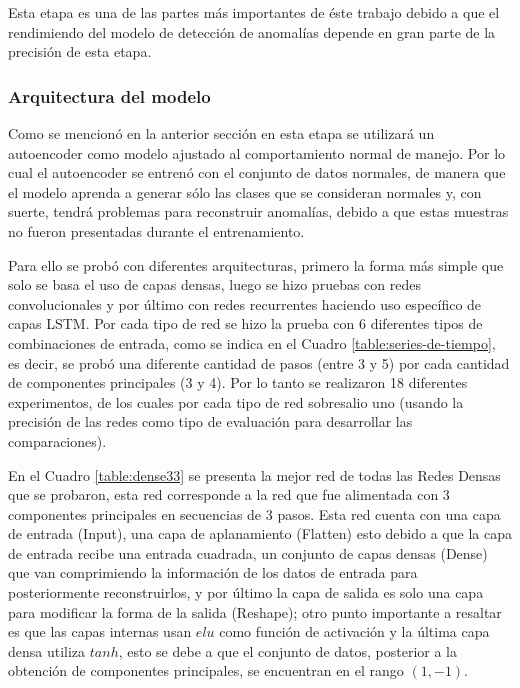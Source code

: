 Esta etapa es una de las partes m\'{a}s importantes de \'{e}ste trabajo debido a que el rendimiendo del modelo de detecci\'{o}n de anomal\'{i}as depende en gran parte de la precisi\'{o}n de esta etapa.

\subsubsection{Arquitectura del modelo}

Como se mencion\'{o} en la anterior secci\'{o}n en esta etapa se utilizar\'{a} un autoencoder como modelo ajustado al comportamiento normal de manejo. Por lo cual el autoencoder se entren\'{o} con el conjunto de datos normales, de manera que el modelo aprenda a generar s\'{o}lo las clases que se consideran normales y, con suerte, tendr\'{a} problemas para reconstruir anomal\'{i}as, debido a que estas muestras no fueron presentadas durante el entrenamiento.

\vspace{5mm} %

Para ello se prob\'{o} con diferentes arquitecturas, primero la forma m\'{a}s simple que solo se basa el uso de capas densas, luego se hizo pruebas con redes convolucionales y por \'{u}ltimo con redes recurrentes haciendo uso espec\'{i}fico de capas LSTM. Por cada tipo de red se hizo la prueba con 6 diferentes tipos de combinaciones de entrada, como se indica en el Cuadro \ref{table:series-de-tiempo}, es decir, se prob\'{o} una diferente cantidad de pasos (entre 3 y 5) por cada cantidad de componentes principales (3 y 4). Por lo tanto se realizaron 18 diferentes experimentos, de los cuales por cada tipo de red sobresalio uno (usando la precisi\'{o}n de las redes como tipo de evaluaci\'{o}n para desarrollar las comparaciones).

\vspace{5mm} %

En el Cuadro \ref{table:dense33} se presenta la mejor red de todas las Redes Densas que se probaron, esta red corresponde a la red que fue alimentada con 3 componentes principales en secuencias de 3 pasos. Esta red cuenta con una capa de entrada (Input), una capa de aplanamiento (Flatten) esto debido a que la capa de entrada recibe una entrada cuadrada, un conjunto de capas densas (Dense) que van comprimiendo la informaci\'{o}n de los datos de entrada para posteriormente reconstruirlos, y por \'{u}ltimo la capa de salida es solo una capa para modificar la forma de la salida (Reshape); otro punto importante a resaltar es que las capas internas usan $elu$ como funci\'{o}n de activaci\'{o}n y la \'{u}ltima capa densa utiliza $tanh$, esto se debe a que el conjunto de datos, posterior a la obtenci\'{o}n de componentes principales, se encuentran en el rango $(1, -1)$.


